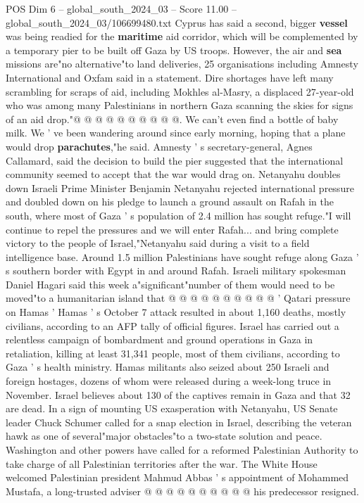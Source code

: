 \begin{textsample}{POS Dim 6 – global\_south\_2024\_03 – Score 11.00 – global\_south\_2024\_03/106699480.txt}
Cyprus has said a second, bigger \textbf{vessel} was being readied for the \textbf{maritime} aid corridor, which will be complemented by a temporary pier to be built off Gaza by US troops.
However, the air and \textbf{sea} missions are"no alternative"to land deliveries, 25 organisations including Amnesty International and Oxfam said in a statement.
Dire shortages have left many scrambling for scraps of aid, including Mokhles al-Masry, a displaced 27-year-old who was among many Palestinians in northern Gaza scanning the skies for signs of an aid drop."@ @ @ @ @ @ @ @ @ @.
We can't even find a bottle of baby milk.
We ' ve been wandering around since early morning, hoping that a plane would drop \textbf{parachutes},"he said.
Amnesty ' s secretary-general, Agnes Callamard, said the decision to build the pier suggested that the international community seemed to accept that the war would drag on.
Netanyahu doubles down Israeli Prime Minister Benjamin Netanyahu rejected international pressure and doubled down on his pledge to launch a ground assault on Rafah in the south, where most of Gaza ' s population of 2.4 million has sought refuge."I will continue to repel the pressures and we will enter Rafah... and bring complete victory to the people of Israel,"Netanyahu said during a visit to a field intelligence base.
Around 1.5 million Palestinians have sought refuge along Gaza ' s southern border with Egypt in and around Rafah.
Israeli military spokesman Daniel Hagari said this week a"significant"number of them would need to be moved"to a humanitarian island that @ @ @ @ @ @ @ @ @ @ ' Qatari pressure on Hamas ' Hamas ' s October 7 attack resulted in about 1,160 deaths, mostly civilians, according to an AFP tally of official figures.
Israel has carried out a relentless campaign of bombardment and ground operations in Gaza in retaliation, killing at least 31,341 people, most of them civilians, according to Gaza ' s health ministry.
Hamas militants also seized about 250 Israeli and foreign hostages, dozens of whom were released during a week-long truce in November.
Israel believes about 130 of the captives remain in Gaza and that 32 are dead.
In a sign of mounting US exasperation with Netanyahu, US Senate leader Chuck Schumer called for a snap election in Israel, describing the veteran hawk as one of several"major obstacles"to a two-state solution and peace.
Washington and other powers have called for a reformed Palestinian Authority to take charge of all Palestinian territories after the war.
The White House welcomed Palestinian president Mahmud Abbas ' s appointment of Mohammed Mustafa, a long-trusted adviser @ @ @ @ @ @ @ @ @ @ his predecessor resigned.

\end{textsample}
